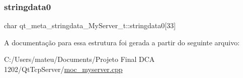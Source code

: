 \subsubsection{\texorpdfstring{stringdata0}{stringdata0}}
{\footnotesize\ttfamily char qt\+\_\+meta\+\_\+stringdata\+\_\+\+My\+Server\+\_\+t\+::stringdata0\mbox{[}33\mbox{]}}



A documentação para essa estrutura foi gerada a partir do seguinte arquivo\+:\begin{DoxyCompactItemize}
\item 
C\+:/\+Users/mateu/\+Documents/\+Projeto Final D\+C\+A 1202/\+Qt\+Tcp\+Server/\mbox{\hyperlink{moc__myserver_8cpp}{moc\+\_\+myserver.\+cpp}}\end{DoxyCompactItemize}
